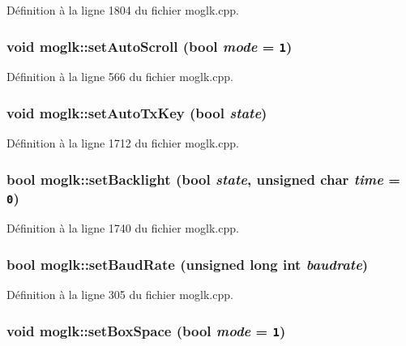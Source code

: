 Définition à la ligne 1804 du fichier moglk.cpp.\hypertarget{classmoglk_38e9c9bda5fbe192d696ae67246c0bef}{
\subsubsection[{setAutoScroll}]{\setlength{\rightskip}{0pt plus 5cm}void moglk::setAutoScroll (bool {\em mode} = {\tt 1})}}
\label{classmoglk_38e9c9bda5fbe192d696ae67246c0bef}




Définition à la ligne 566 du fichier moglk.cpp.\hypertarget{classmoglk_60acc221e5d147e977aead13e60b9cc2}{
\subsubsection[{setAutoTxKey}]{\setlength{\rightskip}{0pt plus 5cm}void moglk::setAutoTxKey (bool {\em state})}}
\label{classmoglk_60acc221e5d147e977aead13e60b9cc2}




Définition à la ligne 1712 du fichier moglk.cpp.\hypertarget{classmoglk_d3b82640c34684aad6105f915ab874a4}{
\subsubsection[{setBacklight}]{\setlength{\rightskip}{0pt plus 5cm}bool moglk::setBacklight (bool {\em state}, \/  unsigned char {\em time} = {\tt 0})}}
\label{classmoglk_d3b82640c34684aad6105f915ab874a4}




Définition à la ligne 1740 du fichier moglk.cpp.\hypertarget{classmoglk_788fca7601af41bd23d2f310ecc34100}{
\subsubsection[{setBaudRate}]{\setlength{\rightskip}{0pt plus 5cm}bool moglk::setBaudRate (unsigned long int {\em baudrate})}}
\label{classmoglk_788fca7601af41bd23d2f310ecc34100}




Définition à la ligne 305 du fichier moglk.cpp.\hypertarget{classmoglk_ad564fea38cd80622152c152bfe62f4e}{
\subsubsection[{setBoxSpace}]{\setlength{\rightskip}{0pt plus 5cm}void moglk::setBoxSpace (bool {\em mode} = {\tt 1})}}
\label{classmoglk_ad564fea38cd80622152c152bfe62f4e}




